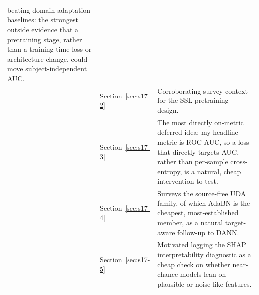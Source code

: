 \documentclass[11pt]{report}
\begin{document}
\begin{longtable}{p{3.4cm}p{2.4cm}p{6.8cm}}
beating domain-adaptation baselines: the strongest outside evidence that a
pretraining stage, rather than a training-time loss or architecture change,
could move subject-independent AUC. \\
\addlinespace
\citet{weng2023sslsurvey} &
Section~\ref{sec:s17-2} &
Corroborating survey context for the SSL-pretraining design. \\
\addlinespace
\citet{xiao2024aucmax} &
Section~\ref{sec:s17-3} &
The most directly on-metric deferred idea: my headline metric is ROC-AUC,
so a loss that directly targets AUC, rather than per-sample cross-entropy,
is a natural, cheap intervention to test. \\
\addlinespace
\citet{imtiaz2025sourcefree} &
Section~\ref{sec:s17-4} &
Surveys the source-free UDA family, of which AdaBN is the cheapest,
most-established member, as a natural target-aware follow-up to DANN. \\
\addlinespace
\citet{mouazen2025hybrid} &
Section~\ref{sec:s17-5} &
Motivated logging the SHAP interpretability diagnostic as a cheap check on
whether near-chance models lean on plausible or noise-like features. \\
\bottomrule
\end{longtable}
\end{document}
